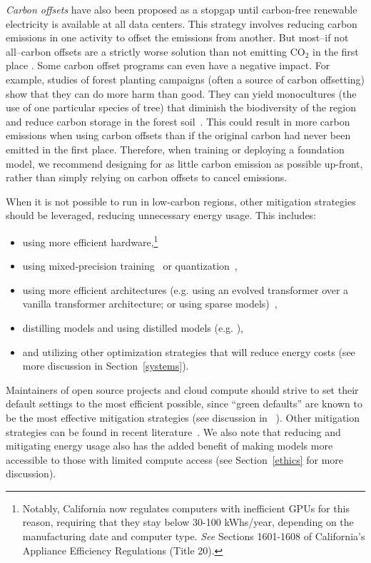 \textit{Carbon offsets} have also been proposed as a stopgap until carbon-free renewable electricity is available at all data centers. This strategy involves reducing carbon emissions in one activity to offset the emissions from another. But most--if not all--carbon offsets are a strictly worse solution than not emitting CO$_{2}$ in the first place \cite{holl_tree_2020}. Some carbon offset programs can even have a negative impact. For example,  studies of forest planting campaigns (often a source of carbon offsetting) show that they can do more harm than good. They can yield monocultures (the use of one particular species of tree) that diminish the biodiversity of the region and reduce carbon storage in the forest soil~\citep{heilmayr2020impacts,hong2020divergent}. This could result in more carbon emissions when using carbon offsets than if the original carbon had never been emitted in the first place. Therefore, when training or deploying a foundation model, we recommend designing for as little carbon emission as possible up-front, rather than simply relying on carbon offsets to cancel emissions.

When it is not possible to run in low-carbon regions, other mitigation strategies should be leveraged, reducing unnecessary energy usage. This includes:

\begin{itemize}
    \item using more efficient hardware,\footnote{Notably, California now regulates computers with inefficient GPUs for this reason, requiring that they stay below 30-100 kWhs/year, depending on the manufacturing date and computer type. \emph{See} Sections 1601-1608 of California’s Appliance Efficiency Regulations (Title 20).}
\item using mixed-precision training~\citep{micikevicius2017mixed} or quantization~\citep{gholami2021survey},
\item using more efficient architectures (e.g. using an evolved transformer over a vanilla transformer architecture; or using sparse models)~\citep{pmlr-v97-so19a,patterson2021carbon,mostafa_parameter_2019},
\item distilling models and using distilled models (e.g. \citep{sanh2019distilbert}),
\item and utilizing other optimization strategies that will reduce energy costs (see more discussion in Section~\ref{systems}).
\end{itemize}

Maintainers of open source projects and cloud compute should strive to set their default settings to the most efficient possible, since ``green defaults'' are known to be the most effective mitigation strategies (see discussion in ~\citep{henderson2020towards}). Other mitigation strategies can be found in recent literature~\citep{strubell2019energy,lacoste2019quantifying,schwartz2019green,henderson2020towards}. We also note that reducing and mitigating energy usage also has the added benefit of making models more accessible to those with limited compute access (see Section~\ref{ethics} for more discussion).

